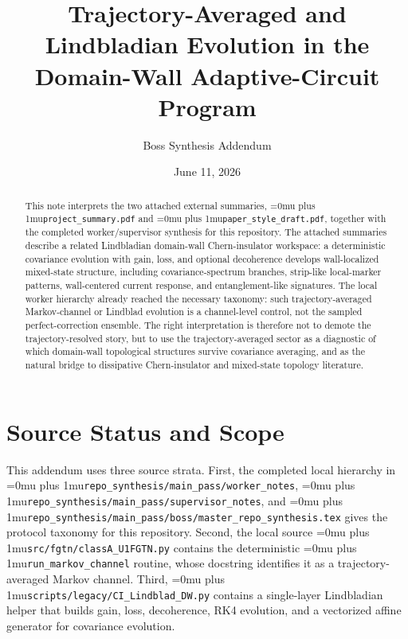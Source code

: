 \documentclass[aps,prb,onecolumn,nofootinbib,superscriptaddress]{revtex4-2}
\newcommand{\src}[1]{\begingroup\ttfamily\Urlmuskip=0mu plus 1mu\relax\nolinkurl{#1}\endgroup}
\begin{document}
\title{Trajectory-Averaged and Lindbladian Evolution in the Domain-Wall Adaptive-Circuit Program}
\author{Boss Synthesis Addendum}
\date{June 11, 2026}

\begin{abstract}
This note interprets the two attached external summaries,
\src{project_summary.pdf} and \src{paper_style_draft.pdf}, together with the
completed worker/supervisor synthesis for this repository.  The attached
summaries describe a related Lindbladian domain-wall Chern-insulator workspace:
a deterministic covariance evolution with gain, loss, and optional decoherence
develops wall-localized mixed-state structure, including covariance-spectrum
branches, strip-like local-marker patterns, wall-centered current response, and
entanglement-like signatures.  The local worker hierarchy already reached the
necessary taxonomy: such trajectory-averaged Markov-channel or Lindblad
evolution is a channel-level control, not the sampled perfect-correction
ensemble.  The right interpretation is therefore not to demote the
trajectory-resolved story, but to use the trajectory-averaged sector as a
diagnostic of which domain-wall topological structures survive covariance
averaging, and as the natural bridge to dissipative Chern-insulator and
mixed-state topology literature.
\end{abstract}

\maketitle
\setcounter{tocdepth}{2}
\tableofcontents

\section{Source Status and Scope}

This addendum uses three source strata.  First, the completed local hierarchy in
\src{repo_synthesis/main_pass/worker_notes},
\src{repo_synthesis/main_pass/supervisor_notes}, and
\src{repo_synthesis/main_pass/boss/master_repo_synthesis.tex} gives the
protocol taxonomy for this repository.  Second, the local source
\src{src/fgtn/classA_U1FGTN.py} contains the deterministic
\src{run_markov_channel} routine, whose docstring identifies it as a
trajectory-averaged Markov channel.  Third, \src{scripts/legacy/CI_Lindblad_DW.py} contains a
single-layer Lindbladian helper that builds gain, loss, decoherence, RK4
evolution, and a vectorized affine generator for covariance evolution.
\end{document}
